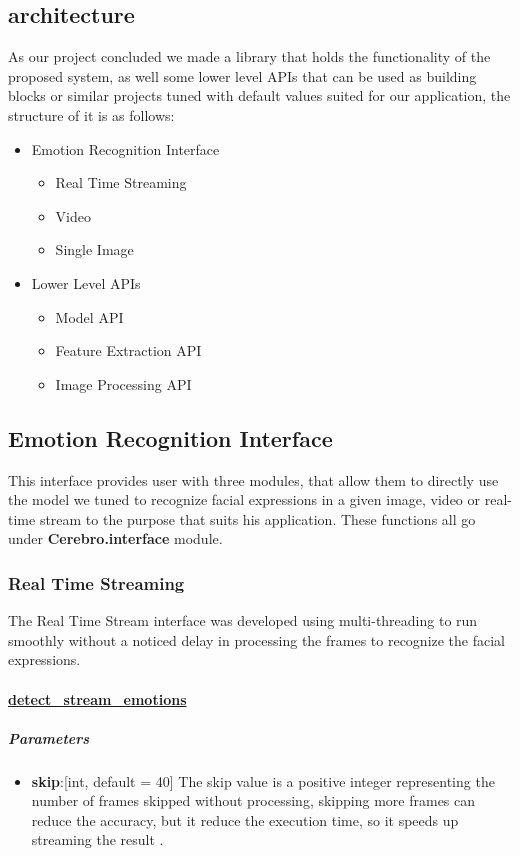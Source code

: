 \subsection{architecture}
As our project concluded we made a library that holds the functionality of the proposed system, as well some lower level APIs that can be used as building blocks or similar projects tuned with default values suited for our application, the structure of it is as follows:
\begin{itemize}
	\item Emotion Recognition Interface 
	\begin{itemize}[noitemsep,nolistsep]
		\item Real Time Streaming
		\item Video
		\item Single Image
	\end{itemize}
	\item Lower Level APIs
	\begin{itemize}[noitemsep,nolistsep]
		\item Model API
		\item Feature Extraction API
		\item Image Processing API
	\end{itemize}
\end{itemize}

\subsection{Emotion Recognition Interface}
This interface provides user with three modules, that allow them to directly use the model we tuned to recognize facial expressions in a given image, video or real-time stream to the purpose that suits his application.\newline
These functions all go under \textbf{Cerebro.interface} module.

\subsubsection{Real Time Streaming}
The Real Time Stream interface was developed using multi-threading to run smoothly without a noticed delay in processing the frames to recognize the facial expressions. 

\paragraph{\underline{detect\_stream\_emotions}}%
\subparagraph{Parameters}
\begin{changemargin}{0.5cm}{0cm}
	\begin{itemize}[noitemsep,nolistsep]
		\item\textbf{skip}:[int, default = 40] The skip value is a positive integer representing the number of frames skipped without processing, skipping more frames can reduce the accuracy, but it reduce the execution time, so it speeds up streaming the result .
	\end{itemize}
\end{changemargin}

